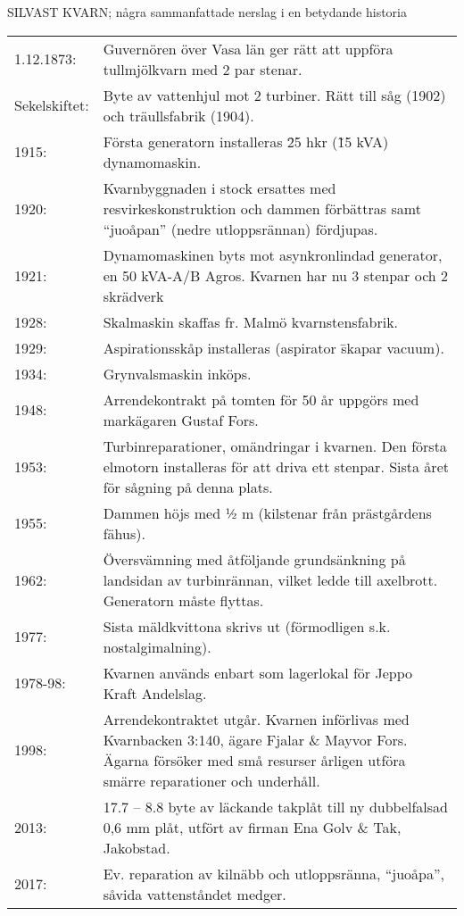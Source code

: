 SILVAST KVARN; några sammanfattade nerslag i en betydande historia
\begin{center}
  \begin{tabular}{l p{}}
    \hline
    1.12.1873: &	Guvernören över Vasa län ger rätt att uppföra tullmjölkvarn med 2 par	stenar. \\
    Sekelskiftet: &	Byte av vattenhjul mot 2 turbiner. Rätt till såg (1902) och träullsfabrik (1904). \\
    1915: &	Första generatorn installeras \= 25 hkr (\~15 kVA) dynamomaskin. \\
    1920: &	Kvarnbyggnaden i stock ersattes med resvirkeskonstruktion och dammen förbättras samt ``juoåpan'' (nedre utloppsrännan) fördjupas. \\
    1921: & Dynamomaskinen byts mot asynkronlindad generator, en 50 kVA-A/B Agros. Kvarnen har nu 3 stenpar och 2 skrädverk \\
    1928: &	Skalmaskin skaffas fr. Malmö kvarnstensfabrik. \\
    1929: &	Aspirationsskåp installeras (aspirator \= skapar vacuum). \\
    1934: &	Grynvalsmaskin inköps. \\
    1948:	&	Arrendekontrakt på tomten för 50 år uppgörs med markägaren Gustaf Fors. \\
    1953: &	Turbinreparationer, omändringar i kvarnen. Den första elmotorn installeras för att driva ett stenpar. Sista året för sågning på denna plats. \\
    1955: &	Dammen höjs med ½ m (kilstenar från prästgårdens fähus). \\
    1962: &	Översvämning med åtföljande grundsänkning på landsidan av turbinrännan, vilket ledde till axelbrott. Generatorn måste flyttas. \\
    1977: &	Sista mäldkvittona skrivs ut (förmodligen s.k. nostalgimalning). \\
    1978-98: & Kvarnen används enbart som lagerlokal för Jeppo Kraft Andelslag. \\
    1998:	&	Arrendekontraktet utgår. Kvarnen införlivas med Kvarnbacken 3:140, ägare Fjalar \& Mayvor Fors. Ägarna försöker med små resurser årligen utföra smärre reparationer och underhåll. \\
    2013:	&	17.7 – 8.8 byte av läckande takplåt till ny dubbelfalsad 0,6 mm plåt, utfört av firman Ena Golv \& Tak, Jakobstad. \\
    2017: & Ev. reparation av kilnäbb och utloppsränna, ``juoåpa'', såvida vattenståndet medger. \\
    \hline
  \end{tabular}
\end{center}



